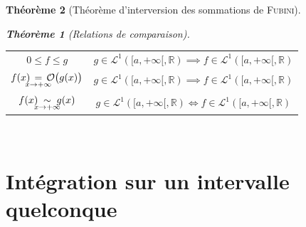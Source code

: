 \documentclass[11pt,a4paper]{report}
\newtheorem{theorem}{Théorème}[chapter]
\newtheorem{itheorem}[theorem]{Théorème}
\theoremstyle{definition}
\begin{document}
\begin{theorem}[Théorème d'interversion des sommations de \textsc{Fubini}]
\begin{itheorem}[Relations de comparaison]
     \\[0.4\baselineskip]
     \begin{tabular}{@{si }c@{, \qquad}c }
         $0\le f \le g$&$g \in \mathcal{L}^1\left( [a,+\infty [,\ensuremath{\mathbb{R}}\right)\implies f \in \mathcal{L}^1\left( [a,+\infty [,\ensuremath{\mathbb{R}}\right)$ \\[6mm]
             $f(x) \, \underset{\mathclap{x\to +\infty}}{=} \, \mathcal{O}\big( g(x)\big)$& $g \in \mathcal{L}^1\left( [a,+\infty [,\ensuremath{\mathbb{R}}\right)\implies f \in \mathcal{L}^1\left( [a,+\infty [,\ensuremath{\mathbb{R}}\right)$\\[6mm]
                 $f(x) \;\underset{\mathclap{x\to +\infty}}{\sim}\; g(x)$&$g \in \mathcal{L}^1\left( [a,+\infty [,\ensuremath{\mathbb{R}}\right)\Longleftrightarrow f \in \mathcal{L}^1\left( [a,+\infty [,\ensuremath{\mathbb{R}}\right)$
     \end{tabular}\\
\end{itheorem}

\section{Intégration sur un intervalle quelconque} %
\label{sec:integration_intervalle_quelconque}

\end{theorem}
\end{document}
